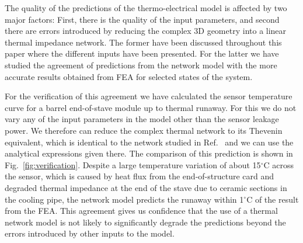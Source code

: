 The quality of the predictions of the thermo-electrical model is affected by two major factors: First, there is the quality of the input parameters, and second there are errors introduced by reducing the complex 3D geometry into a linear thermal impedance network. The former have been discussed throughout this paper where the different inputs have been presented. For the latter we have studied the agreement of predictions from the network model with the more accurate results obtained from FEA for selected states of the system.

For the verification of this agreement we have calculated the sensor temperature curve for a barrel end-of-stave module up to thermal runaway. For this we do not vary any of the input parameters in the model other than the sensor leakage power. We therefore can reduce the complex thermal network to its Thevenin equivalent, which is identical to the network studied in Ref.~\cite{Beck:2010zzd} and we can use the analytical expressions given there. The comparison of this prediction is shown in Fig.~\ref{fig:verification}. Despite a large temperature variation of about 15$^\circ$C across the sensor, which is caused by heat flux from the end-of-structure card and degraded thermal impedance at the end of the stave due to ceramic sections in the cooling pipe, the network model predicts the runaway within 1$^\circ$C of the result from the FEA. This agreement gives us confidence that the use of a thermal network model is not likely to significantly degrade the predictions beyond the errors introduced by other inputs to the model. 

